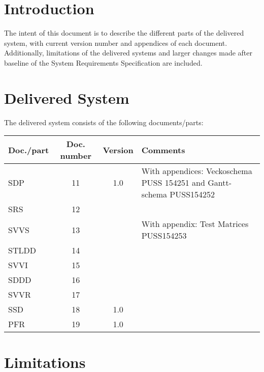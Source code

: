 \documentclass[a4paper]{article}
\begin{document}
\section{Introduction}

The intent of this document is to describe the different parts of the delivered system, with current version number and appendices of each document. Additionally, limitations of the delivered systems and larger changes made after baseline of the System Requirements Specification are included.



\section{Delivered System}

The delivered system consists of the following documents/parts:

\begin{center}
\begin{tabular}{| l | c | c | p{5cm} |}
    \hline
    \textbf{Doc./part} & \textbf{Doc. number} & \textbf{Version} & \textbf{Comments} \\ \hline
    SDP & 11 & 1.0 & With appendices: Veckoschema PUSS 154251 and Gantt-schema PUSS154252 \\ \hline
    SRS & 12 &  & \\ \hline
    SVVS & 13 & & With appendix: Test Matrices PUSS154253 \\ \hline
    STLDD & 14 & & \\ \hline
    SVVI & 15 & & \\ \hline
    SDDD & 16 & & \\ \hline
    SVVR & 17 & & \\ \hline
    SSD & 18 & 1.0 & \\ \hline
    PFR & 19 & 1.0 & \\ \hline

\end{tabular}
\end{center}

\section{Limitations}
\end{document}
